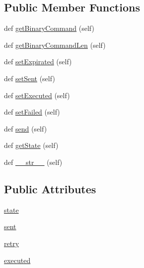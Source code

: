 \subsection*{Public Member Functions}
\begin{DoxyCompactItemize}
\item 
def \hyperlink{class_ground_segment_1_1models_1_1_command_1_1_command_1_1_command_a3f0b2457617848ae6d867a6058fcc1a0}{get\+Binary\+Command} (self)
\item 
def \hyperlink{class_ground_segment_1_1models_1_1_command_1_1_command_1_1_command_aa6000a8c60f3a35a339f2ac45051bf70}{get\+Binary\+Command\+Len} (self)
\item 
def \hyperlink{class_ground_segment_1_1models_1_1_command_1_1_command_1_1_command_aebae1a1b03f79eaa44cb36cd1235c603}{set\+Expirated} (self)
\item 
def \hyperlink{class_ground_segment_1_1models_1_1_command_1_1_command_1_1_command_afe71ea8d67e21d06a3cdd89c43536ee8}{set\+Sent} (self)
\item 
def \hyperlink{class_ground_segment_1_1models_1_1_command_1_1_command_1_1_command_a5a728bf98effa04871312727eece77f8}{set\+Executed} (self)
\item 
def \hyperlink{class_ground_segment_1_1models_1_1_command_1_1_command_1_1_command_ae77fb44be1da1955b6e950b24a888712}{set\+Failed} (self)
\item 
def \hyperlink{class_ground_segment_1_1models_1_1_command_1_1_command_1_1_command_a73abcdd7a503bbf76edfdc961e4af6d7}{send} (self)
\item 
def \hyperlink{class_ground_segment_1_1models_1_1_command_1_1_command_1_1_command_a67ba0b0583e08bfd0177db8295eeb0b7}{get\+State} (self)
\item 
def \hyperlink{class_ground_segment_1_1models_1_1_command_1_1_command_1_1_command_a5d2adcf348dcc7490c560fb7ce20b8ce}{\+\_\+\+\_\+str\+\_\+\+\_\+} (self)
\end{DoxyCompactItemize}
\subsection*{Public Attributes}
\begin{DoxyCompactItemize}
\item 
\hyperlink{class_ground_segment_1_1models_1_1_command_1_1_command_1_1_command_aef227348bd4c4318c4581d0129883207}{state}
\item 
\hyperlink{class_ground_segment_1_1models_1_1_command_1_1_command_1_1_command_ae2419eab6196f3574e530cf0d63fca06}{sent}
\item 
\hyperlink{class_ground_segment_1_1models_1_1_command_1_1_command_1_1_command_a243562f6a594c1010710fdd675786e03}{retry}
\item 
\hyperlink{class_ground_segment_1_1models_1_1_command_1_1_command_1_1_command_a239dc5ac77fcf562791b8edd234a074d}{executed}
\end{DoxyCompactItemize}
